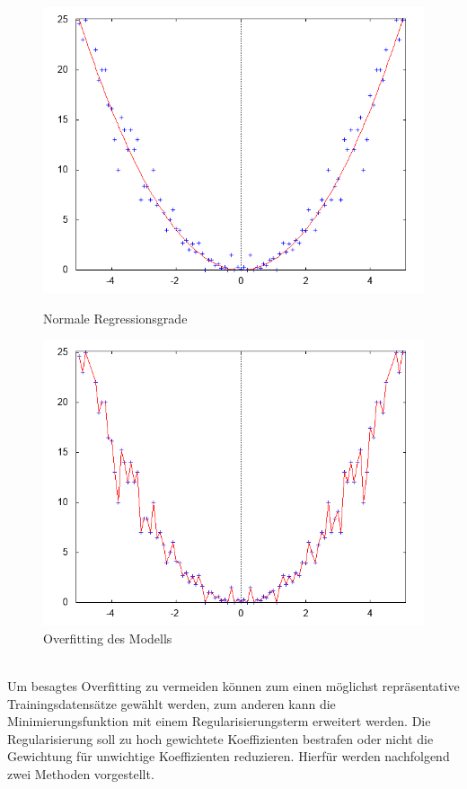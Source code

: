 \begin{figure}[ht]
\centering
	\begin{minipage}[b]{.4\linewidth}
  		\includegraphics[scale=0.4]{bilder/normal}
  		\caption{Normale Regressionsgrade}
  	\end{minipage}
  	\hspace{.1\linewidth}%
  	\begin{minipage}[b]{.4\linewidth}
  		\includegraphics[scale=0.4]{bilder/overfitting}
		\caption{Overfitting des Modells}
	\end{minipage}
	
\end{figure}\\
Um besagtes Overfitting zu vermeiden können zum einen möglichst repräsentative Trainingsdatensätze gewählt werden, zum anderen kann die Minimierungsfunktion mit einem Regularisierungsterm erweitert werden.
Die Regularisierung soll zu hoch gewichtete Koeffizienten bestrafen oder nicht die Gewichtung für unwichtige Koeffizienten reduzieren.
Hierfür werden nachfolgend zwei Methoden vorgestellt.
